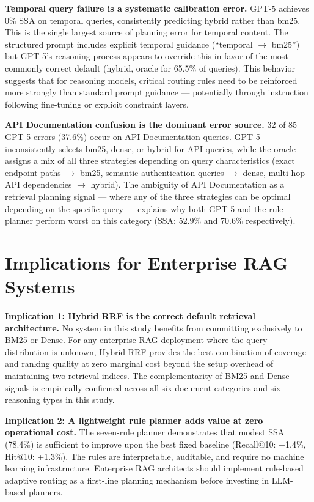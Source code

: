 \textbf{Temporal query failure is a systematic calibration error.} GPT-5 achieves 0\% SSA on temporal queries, consistently predicting hybrid rather than bm25. This is the single largest source of planning error for temporal content. The structured prompt includes explicit temporal guidance (``temporal $\rightarrow$ bm25'') but GPT-5's reasoning process appears to override this in favor of the most commonly correct default (hybrid, oracle for 65.5\% of queries). This behavior suggests that for reasoning models, critical routing rules need to be reinforced more strongly than standard prompt guidance --- potentially through instruction following fine-tuning or explicit constraint layers.

\textbf{API Documentation confusion is the dominant error source.} 32 of 85 GPT-5 errors (37.6\%) occur on API Documentation queries. GPT-5 inconsistently selects bm25, dense, or hybrid for API queries, while the oracle assigns a mix of all three strategies depending on query characteristics (exact endpoint paths $\rightarrow$ bm25, semantic authentication queries $\rightarrow$ dense, multi-hop API dependencies $\rightarrow$ hybrid). The ambiguity of API Documentation as a retrieval planning signal --- where any of the three strategies can be optimal depending on the specific query --- explains why both GPT-5 and the rule planner perform worst on this category (SSA: 52.9\% and 70.6\% respectively).

\section{Implications for Enterprise RAG Systems}
\label{sec:disc_implications}

\noindent\textbf{Implication 1: Hybrid RRF is the correct default retrieval architecture.} No system in this study benefits from committing exclusively to BM25 or Dense. For any enterprise RAG deployment where the query distribution is unknown, Hybrid RRF provides the best combination of coverage and ranking quality at zero marginal cost beyond the setup overhead of maintaining two retrieval indices. The complementarity of BM25 and Dense signals \citep{luan2021sparse_dense} is empirically confirmed across all six document categories and six reasoning types in this study.

\noindent\textbf{Implication 2: A lightweight rule planner adds value at zero operational cost.} The seven-rule planner demonstrates that modest SSA (78.4\%) is sufficient to improve upon the best fixed baseline (Recall@10: +1.4\%, Hit@10: +1.3\%). The rules are interpretable, auditable, and require no machine learning infrastructure. Enterprise RAG architects should implement rule-based adaptive routing as a first-line planning mechanism before investing in LLM-based planners.

